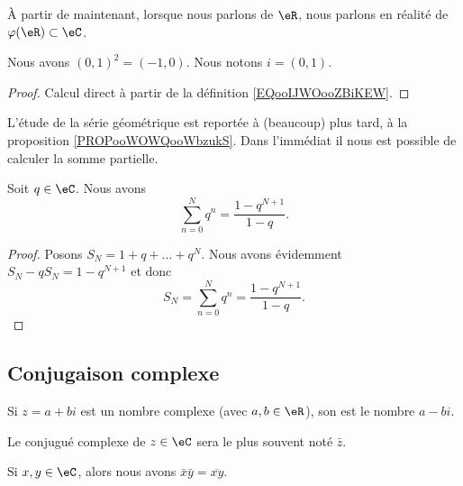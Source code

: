 \begin{normaltext}
	À partir de maintenant, lorsque nous parlons de \( \eR\), nous parlons en réalité de \( \varphi(\eR)\subset \eC\).
\end{normaltext}

\begin{lemma}
	Nous avons \( (0,1)^2=(-1,0)\). Nous notons \( i=(0,1)\).
\end{lemma}

\begin{proof}
	Calcul direct à partir de la définition \ref{EQooIJWOooZBiKEW}.
\end{proof}


L'étude de la série géométrique est reportée à (beaucoup) plus tard, à la proposition \ref{PROPooWOWQooWbzukS}. Dans l'immédiat il nous est possible de calculer la somme partielle.
\begin{lemma}      \label{LEMooAFSCooWEVlvp}
	Soit \( q\in \eC\). Nous avons
	\begin{equation}
		\sum_{n=0}^Nq^n=\frac{ 1-q^{N+1} }{ 1-q }.
	\end{equation}
\end{lemma}

\begin{proof}
	Posons \( S_N=1+q+\ldots+q^N\). Nous avons évidemment \( S_N-qS_N=1-q^{N+1}\) et donc
	\begin{equation}    \label{EqASYTiCK}
		S_N=\sum_{n=0}^Nq^n=\frac{ 1-q^{N+1} }{ 1-q }.
	\end{equation}
\end{proof}

\subsection{Conjugaison complexe}

\begin{definition}      \label{DEFooQDDVooRYDsAJ}
	Si \( z=a+bi\) est un nombre complexe (avec \( a,b\in \eR\)), son  est le nombre \( a-bi\).

	Le conjugué complexe de \( z\in \eC\) sera le plus souvent noté \( \bar z\).
\end{definition}

\begin{proposition}	\label{PROPooKBOIooRJPXAH}
	Si \( x,y\in \eC\), alors nous avons \( \bar x\bar y=\overline{xy} \).
\end{proposition}

